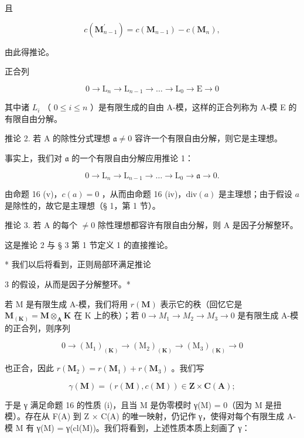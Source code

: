 且

\[
c (\mathbf {M} _ {n - 1} ^ {\prime}) = c (\mathbf {M} _ {n - 1}) - c (\mathbf {M} _ {n}),
\]

由此得推论。

正合列

\[
0 \rightarrow \mathrm{L} _ {n} \rightarrow \mathrm{L} _ {n - 1} \rightarrow \dots \rightarrow \mathrm{L} _ {0} \rightarrow \mathrm{E} \rightarrow 0
\]

其中诸 \(L_{i}\) （ \(0 \leqslant i \leqslant n\) ）是有限生成的自由 A-模，这样的正合列称为 A-模 E 的有限自由分解。

推论 2. 若 A 的除性分式理想 \(\mathfrak{a} \neq 0\) 容许一个有限自由分解，则它是主理想。

事实上，我们对 \(\mathfrak{a}\) 的一个有限自由分解应用推论 1：

\[
0 \rightarrow \mathrm{L} _ {n} \rightarrow \mathrm{L} _ {n - 1} \rightarrow \dots \rightarrow \mathrm{L} _ {0} \rightarrow \mathfrak {a} \rightarrow 0.
\]

由命题 16 (v)，\(c(a) = 0\) ，从而由命题 16 (iv)，\(\text{div}(a)\) 是主理想；由于假设 \(a\) 是除性的，故它是主理想（§ 1，第 1 节）。

推论 3. 若 A 的每个 \(\neq 0\) 除性理想都容许有限自由分解，则 A 是因子分解整环。

这是推论 2 与 § 3 第 1 节定义 1 的直接推论。

* 我们以后将看到，正则局部环满足推论

3 的假设，从而是因子分解整环。*

若 M 是有限生成 A-模，我们将用 \(r(\mathbf{M})\) 表示它的秩（回忆它是 \(\mathbf{M}_{(\mathbf{K})} = \mathbf{M} \otimes_{\mathbf{A}} \mathbf{K}\) 在 K 上的秩）；若 \(0 \to M_{1} \to M_{2} \to M_{3} \to 0\) 是有限生成 A-模的正合列，则序列

\[
0 \rightarrow (\mathrm{M} _ {1}) _ {(\mathbf {K})} \rightarrow (\mathrm{M} _ {2}) _ {(\mathbf {K})} \rightarrow (\mathrm{M} _ {3}) _ {(\mathbf {K})} \rightarrow 0
\]

也正合，因此 \(r(\mathbf{M}_2) = r(\mathbf{M}_1) + r(\mathbf{M}_3)\) 。我们写

\[
\gamma (\mathbf {M}) = (r (\mathbf {M}), c (\mathbf {M})) \in \mathbf {Z} \times \mathbf {C} (\mathbf {A});
\]

于是 γ 满足命题 16 的性质 (i)，且当 M 是伪零模时 γ(M) = 0（因为 M 是扭模）。存在从 F(A) 到 Z × C(A) 的唯一映射，仍记作 γ，使得对每个有限生成 A-模 M 有 γ(M) = γ(cl(M))。我们将看到，上述性质本质上刻画了 γ：


